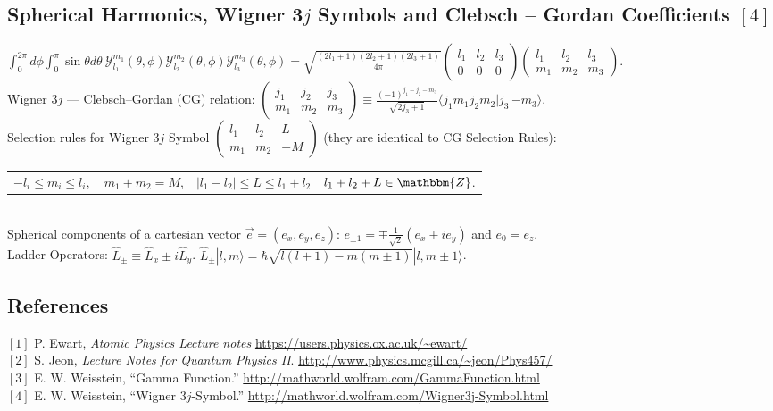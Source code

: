 \documentclass[english,11pt]{shreyasnotes}
\begin{document}
\subsection*{Spherical Harmonics, Wigner 3$j$ Symbols and Clebsch -- Gordan Coefficients $[4]$}
$\int_0^{2 \pi} d\phi \int_0^{\pi} \sin \theta d\theta \ \mathcal{Y}_{l_1}^{m_1}(\theta,\phi) \mathcal{Y}_{l_2}^{m_2}(\theta,\phi) \mathcal{Y}_{l_3}^{m_3}(\theta,\phi)=\sqrt{\frac{(2l_1+1)(2l_2+1)(2l_3+1)}{4 \pi}} \begin{pmatrix}
  l_1 & l_2 & l_3\\
  0 & 0 & 0
\end{pmatrix}
\begin{pmatrix}
  l_1 & l_2 & l_3\\
  m_1 & m_2 & m_3
\end{pmatrix}
$.
\\

\noindent Wigner 3$j$ --- Clebsch--Gordan (CG) relation:
$
\begin{pmatrix}
  j_1 & j_2 & j_3\\
  m_1 & m_2 & m_3
\end{pmatrix}
\equiv \frac{(-1)^{j_1-j_2-m_3}}{\sqrt{2j_3+1}} \langle j_1 m_1 j_2 m_2 | j_3 \, {-m_3} \rangle.$\\

\noindent Selection rules for Wigner 3$j$ Symbol $\begin{pmatrix}  l_1 & l_2 & L\\   m_1 & m_2 & -M \end{pmatrix}$ (they are identical to CG Selection Rules):

\noindent 
\begin{tabular}{llll}
$-l_i \leq m_i \leq l_i, $ & $m_1+m_2=M$, & $|l_1-l_2|\leqslant L \leqslant l_1+l_2$ & $l_1+l_2+L \in \mathbbm{Z}$.
\end{tabular}
\\

\noindent Spherical components of a cartesian vector $\vec e=(e_x,e_y,e_z)$: $e_{\pm 1}=\mp \frac{1}{\sqrt{2}} \left( e_x\pm i e_y \right)$ and $e_0=e_z$.\\

\noindent Ladder Operators: $ \hat L_{\pm}\equiv \hat L_x\pm i \hat L_y$. \space \space \space $\hat L_{\pm} |l,m \rangle=\hbar \sqrt{l(l+1)-m(m\pm1)}|l,m\pm1 \rangle$.

\subsection*{References}
$[1]$ P. Ewart, \textit{Atomic Physics Lecture notes} \url{https://users.physics.ox.ac.uk/~ewart/}\\
$[2]$ S. Jeon, \textit{Lecture Notes for Quantum Physics II}. \url{http://www.physics.mcgill.ca/~jeon/Phys457/}\\
$[3]$ E. W. Weisstein, ``Gamma Function.'' \url{http://mathworld.wolfram.com/GammaFunction.html}\\
$[4]$ E. W. Weisstein, ``Wigner 3$j$-Symbol.'' \url{http://mathworld.wolfram.com/Wigner3j-Symbol.html}
\end{document}
